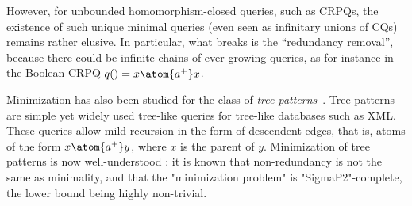 However, for unbounded homomorphism-closed queries, such as CRPQs, the existence of such unique minimal queries (even seen as infinitary unions of CQs) remains rather elusive. In particular, what breaks is the ``redundancy removal'', because there could be infinite chains of ever growing queries, as for instance in the Boolean CRPQ $q() = x \atom{a^+} x$.

Minimization has also been studied for the class of \emph{tree patterns}~\cite{FlescaFurfaroMasciari2008Minimization,KimelfeldSagiv2008Revisiting,CzerwinskiMartensNiewerthParys2018Minimization}. Tree patterns are simple yet widely used tree-like queries for tree-like databases such as XML. These queries allow mild recursion in the form of descendent edges, that is, atoms of the form $x \atom{a^+} y$, where $x$ is the parent of $y$. 
Minimization of tree patterns is now well-understood \cite{CzerwinskiMartensNiewerthParys2018Minimization}:  it is known that non-redundancy is not the same as minimality, and that the "minimization problem" is "SigmaP2"-complete, the lower bound being highly non-trivial.